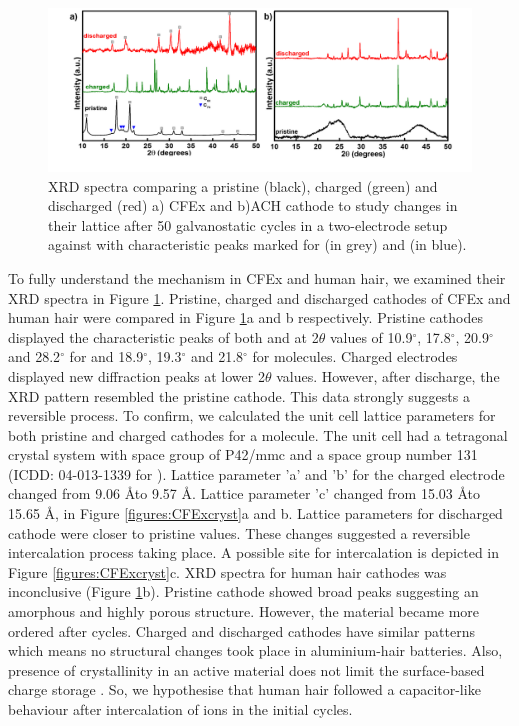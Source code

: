 \documentclass{article}
\begin{document}
\begin{figure}[tbh!]
  \centering
  \includegraphics[width=\textwidth]{figures/XRD}
    \caption{XRD spectra comparing a pristine (black), charged (green) and discharged (red) a) CFEx and b)ACH cathode to study changes in their lattice after 50 galvanostatic cycles in a two-electrode setup against  with characteristic peaks marked for  (in grey) and  (in blue).}
  \label{figures:XRD}
\end{figure}

To fully understand the mechanism in CFEx and human hair, we examined their XRD spectra in Figure \ref{figures:XRD}. Pristine, charged and discharged cathodes of CFEx and human hair were compared in Figure \ref{figures:XRD}a and b respectively. Pristine cathodes displayed the characteristic peaks of both  and  at 2$\theta$ values of 10.9$^{\circ}$, 17.8$^{\circ}$, 20.9$^{\circ}$ and 28.2$^{\circ}$ for  and 18.9$^{\circ}$, 19.3$^{\circ}$ and 21.8$^{\circ}$ for  molecules. Charged electrodes displayed new diffraction peaks at lower 2$\theta$ values. However, after discharge, the XRD pattern resembled the pristine cathode. This data strongly suggests a reversible process. To confirm, we calculated the unit cell lattice parameters for both pristine and charged cathodes for a  molecule. The unit cell had a tetragonal crystal system with space group of P42/mmc and a space group number 131 (ICDD: 04-013-1339 for ). Lattice parameter 'a' and 'b' for the charged electrode changed from 9.06 \AA to 9.57 \AA . Lattice parameter 'c' changed from 15.03 \AA to 15.65 \AA, in Figure \ref{figures:CFExcryst}a and b. Lattice parameters for discharged cathode were closer to pristine values. These changes suggested a reversible intercalation process taking place. A possible site for  intercalation is depicted in Figure \ref{figures:CFExcryst}c. XRD spectra for human hair cathodes was inconclusive (Figure \ref{figures:XRD}b). Pristine cathode showed broad peaks suggesting an amorphous and highly porous structure. However, the material became more ordered after cycles. Charged and discharged cathodes have similar patterns which means no structural changes took place in aluminium-hair batteries. Also, presence of crystallinity in an active material does not limit the surface-based charge storage \cite{kim_synthesis_2006, jow_factors_2018}. So, we hypothesise that human hair followed a capacitor-like behaviour after intercalation of ions in the initial cycles.
\end{document}
